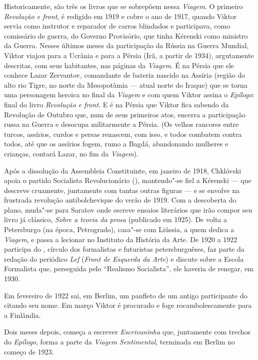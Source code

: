 Historicamente, são três os livros que se sobrepõem nessa \emph{Viagem}.
O primeiro \emph{Revolução e front}, é redigido em 1919 e cobre o ano de
1917, quando Viktor servia como instrutor e reparador de carros
blindados e participava, como comissário de guerra, do Governo
Provisório, que tinha Kérenski como ministro da Guerra. Nesses últimos
meses da participação da Rússia na  Guerra Mundial, Viktor viajou para
a Ucrânia e para a Pérsia (Irã, a partir de 1934), argutamente
descritas, com seus habitantes, nas páginas da \emph{Viagem}. É na
Pérsia que ele conhece Lazar Zervantov, comandante de bateria nascido na
Assíria (região do alto rio Tigre, no norte da Mesopotâmia --- atual
norte do Iraque) que se
torna uma personagem heroica no final da \emph{Viagem} e com quem Viktor
assina o \emph{Epílogo}: final do livro \emph{Revolução e front}. E é na
Pérsia que Viktor fica sabendo da Revolução de Outubro que, num de seus
primeiros atos, encerra a participação russa na  Guerra e desocupa
militarmente a Pérsia. (Os velhos rancores entre turcos, assírios,
curdos e persas renascem, com isso, e todos combatem contra todos, até
que os assírios fogem, rumo a Bagdá, abandonando mulheres e crianças,
contará Lazar, no fim da \emph{Viagem}).

Após a dissolução da Assembleia Constituinte, em janeiro de 1918,
Chklóvski apoia o partido Socialista Revolucionário (), mantendo"-se
fiel a Kérenski --- que descreve cruamente, juntamente com tantas outras
figuras --- e se envolve na frustrada revolução antibolchevique do verão
de 1919. Com a descoberta do plano, muda"-se para Saratov onde escreve
ensaios literários que irão compor seu livro já clássico, \emph{Sobre a
teoria da prosa} (publicado em 1925). De volta a Petersburgo (na época, Petrogrado), casa"-se com Liússia, a quem dedica a \emph{Viagem}, e passa a lecionar no Instituto da História da Arte. De
1920 a 1922 participa do , círculo dos formalistas e futuristas
petersburguêses, faz parte da redação do periódico \emph{Lef}
(\emph{Front de Esquerda da Arte}) e discute sobre a Escola Formalista
que, perseguida pelo ``Realismo Socialista'', ele haveria de renegar,
em 1930.

Em fevereiro de 1922 sai, em Berlim, um panfleto de um antigo
participante do  citando seu nome. Em março Viktor é procurado e
foge rocambolescamente para a Finlândia.

Dois meses depois, começa a escrever \emph{Escrivaninha} que, juntamente
com trechos do \emph{Epílogo}, forma a  parte da \emph{Viagem
Sentimental}, terminada em Berlim no começo de 1923.

